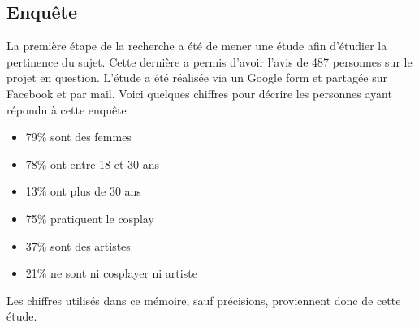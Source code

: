 \documentclass[a4paper,12pt]{article}
\begin{document}
\subsection{Enquête}
La première étape de la recherche a été de mener une étude afin d'étudier la pertinence du sujet.
Cette dernière a permis d'avoir l'avis de 487 personnes sur le projet en question. L'étude a été réalisée via un Google form et partagée sur Facebook et par mail. 
Voici quelques chiffres pour décrire les personnes ayant répondu à cette enquête :
\begin{itemize}
    \item 79\% sont des femmes 
    \item 78\% ont entre 18 et 30 ans
    \item 13\% ont plus de 30 ans
    \item 75\% pratiquent le cosplay
    \item 37\% sont des artistes
    \item 21\% ne sont ni cosplayer ni artiste
\end{itemize}
Les chiffres utilisés dans ce mémoire, sauf précisions, proviennent donc de cette étude. 
\end{document}
